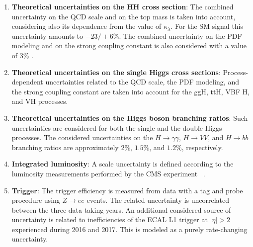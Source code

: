 \begin{enumerate}

  \item \textbf{Theoretical uncertainties on the HH cross section}: The combined uncertainty on the QCD scale and on the top mass is taken into account, considering also its dependence from the value of $\kappa_{\lambda}$. For the SM signal this uncertainty amounts to $-23/+6\% $. The combined uncertainty on the PDF modeling and on the strong coupling constant is also considered with a value of $3\% $ \cite{Grazzini:2018bsd}. 

  \item \textbf{Theoretical uncertainties on the single Higgs cross sections}: Process-dependent uncertainties related to the QCD scale, the PDF modeling, and the strong coupling constant are taken into account for the ggH, ttH, VBF H, and VH processes.

  \item \textbf{Theoretical uncertainties on the Higgs boson branching ratios}: Such uncertainties are considered for both the single and the double Higgs processes. The considered uncertainties on the $H\rightarrow\gamma\gamma$, $H\rightarrow VV$, and $H\rightarrow bb$ branching ratios are approximately $2\% $, $1.5\% $, and $1.2\% $, respectively. 

  \item \textbf{Integrated luminosity}: A scale uncertainty is defined according to the luminosity measurements performed by the CMS experiment ~\cite{CMS-LUM-17-003,CMS-PAS-LUM-17-004,CMS-PAS-LUM-18-002}.

  \item \textbf{Trigger}: The trigger efficiency is measured from data with a tag and probe procedure using $Z \rightarrow ee$ events. The related uncertainty is uncorrelated between the three data taking years. An additional considered source of uncertainty is related to inefficiencies of the ECAL L1 trigger at $|\eta|>2$ experienced during 2016 and 2017. This is modeled as a purely rate-changing uncertainty.



\end{enumerate}

